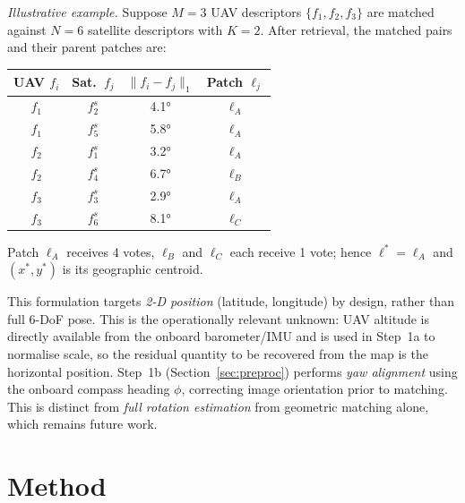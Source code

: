 \documentclass[10pt]{article}
\theoremstyle{plain}
\theoremstyle{definition}
\begin{document}
\noindent\textit{Illustrative example.}
Suppose $M=3$ UAV descriptors $\{f_1,f_2,f_3\}$ are matched against $N=6$
satellite descriptors with $K=2$.
After retrieval, the matched pairs and their parent patches are:

\begin{center}
\small
\begin{tabular}{cccc}
\toprule
UAV $f_i$ & Sat.\ $f_j$ & $\|f_i-f_j\|_1$ & Patch $\ell_j$\\
\midrule
$f_1$ & $f_2^s$ & 4.1° & $\ell_A$ \\
$f_1$ & $f_5^s$ & 5.8° & $\ell_A$ \\
$f_2$ & $f_1^s$ & 3.2° & $\ell_A$ \\
$f_2$ & $f_4^s$ & 6.7° & $\ell_B$ \\
$f_3$ & $f_3^s$ & 2.9° & $\ell_A$ \\
$f_3$ & $f_6^s$ & 8.1° & $\ell_C$ \\
\bottomrule
\end{tabular}
\end{center}

\noindent Patch $\ell_A$ receives 4 votes, $\ell_B$ and $\ell_C$ each receive
1 vote; hence $\ell^* = \ell_A$ and $(x^*,y^*)$ is its geographic centroid.

This formulation targets \emph{2-D position} (latitude, longitude) by design,
rather than full 6-DoF pose.
This is the operationally relevant unknown: UAV altitude is directly available
from the onboard barometer/IMU and is used in Step~1a to normalise scale, so
the residual quantity to be recovered from the map is the horizontal position.
Step~1b (Section~\ref{sec:preproc}) performs \emph{yaw alignment} using the
onboard compass heading $\phi$, correcting image orientation prior to matching.
This is distinct from \emph{full rotation estimation} from geometric matching
alone, which remains future work.

\section{Method}
\label{sec:method}
\end{document}
